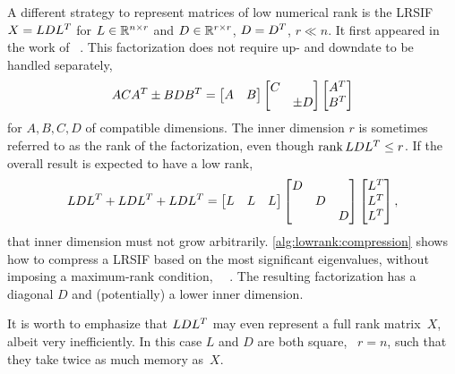 A different strategy to represent matrices of low numerical rank is the \ac{LRSIF}
$X = LDL^T$ for $L\in\mathbb{R}^{n\times r}$ and $D\in\mathbb{R}^{r \times r}$, $D=D^T$, $r\ll n$.
It first appeared in the work of \citeauthor{Benner2009}~\cite{Benner2009}.
This factorization does not require up- and downdate to be handled separately,
\begin{equation}
  ACA^T \pm BDB^T =
  \begin{bmatrix}
    A & B
  \end{bmatrix}
  \begin{bmatrix}
    C \\ & \pm D
  \end{bmatrix}
  \begin{bmatrix}
    A^T \\ B^T
  \end{bmatrix}
\end{equation}
for $A, B, C, D$ of compatible dimensions.
The inner dimension $r$ is sometimes referred to as the rank of the factorization,
even though $\operatorname{rank} LDL^T \leq r$.
If the overall result is expected to have a low rank,
\eg
\begin{equation}
  LDL^T + LDL^T + LDL^T
  = \begin{bmatrix}
    L & L & L
  \end{bmatrix}
  \begin{bmatrix}
    D \\
    & D \\
    && D
  \end{bmatrix}
  \begin{bmatrix}
    L^T \\
    L^T \\
    L^T
  \end{bmatrix}
  ,
\end{equation}
that inner dimension must not grow arbitrarily.
\autoref{alg:lowrank:compression} shows how to compress a \ac{LRSIF}
based on the most significant eigenvalues,
without imposing a maximum-rank condition,
\cf~\citeauthor{Lang2017}~\cite[Section~6.3.3]{Lang2017}.
The resulting factorization has a diagonal $D$ and (potentially) a lower inner dimension.

\begin{remark}
  It is worth to emphasize that $LDL^T$ may even represent a full rank matrix~$X$,
  albeit very inefficiently.
  In this case $L$ and $D$ are both square, \ie~$r=n$,
  such that they take twice as much memory as~$X$.
\end{remark}

